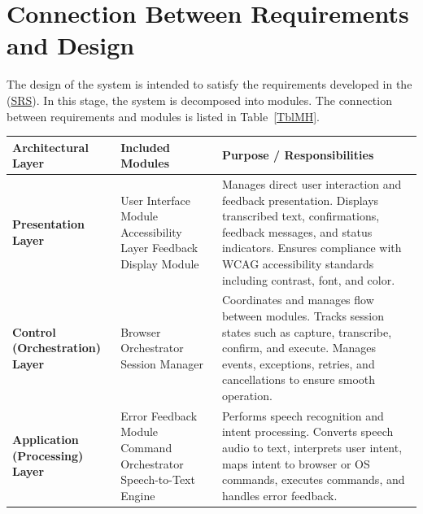 \documentclass[12pt, titlepage]{article}
\begin{document}
\section{Connection Between Requirements and Design} \label{SecConnection}

The design of the system is intended to satisfy the requirements developed in the 
(\href{https://github.com/speech-buddies/VoiceBridge/blob/main/docs/SRS-Volere/SRS.pdf}{SRS}).
In this stage, the system is decomposed into modules. The connection between requirements and modules is listed in Table~\ref{TblMH}.

\begin{table}[htbp]
\centering
\footnotesize
\renewcommand{\arraystretch}{1.1} %
\setlength{\tabcolsep}{6pt}       %
\begin{tabular}{
    >{\raggedright\arraybackslash}p{3cm}
    >{\raggedright\arraybackslash}p{4.8cm}
    >{\raggedright\arraybackslash}p{8.2cm}
}

\toprule
\textbf{Architectural Layer} & \textbf{Included Modules} & \textbf{Purpose / Responsibilities} \\
\midrule

\textbf{Presentation Layer} &
User Interface Module \newline
Accessibility Layer \newline
Feedback Display Module &
Manages direct user interaction and feedback presentation. Displays transcribed text, confirmations, feedback messages, and status indicators. Ensures compliance with WCAG accessibility standards including contrast, font, and color. \\
\midrule

\textbf{Control (Orchestration) Layer} &
Browser Orchestrator \newline
Session Manager  &
Coordinates and manages flow between modules. Tracks session states such as capture, transcribe, confirm, and execute. Manages events, exceptions, retries, and cancellations to ensure smooth operation. \\
\midrule

\textbf{Application (Processing) Layer} &
Error Feedback Module \newline
Command Orchestrator \newline
Speech-to-Text Engine &
Performs speech recognition and intent processing. Converts speech audio to text, interprets user intent, maps intent to browser or OS commands, executes commands, and handles error feedback. \\
\midrule



\end{tabular}
\end{table}
\end{document}
